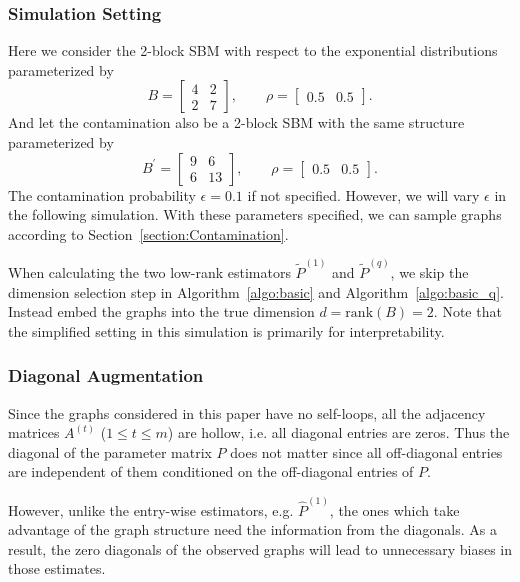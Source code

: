 \documentclass[a4paper]{article}
\renewcommand{\hat}{\widehat}
\begin{document}
\subsubsection{Simulation Setting}
\label{section:sim_setting}
Here we consider the 2-block SBM with respect to the exponential distributions parameterized by
\begin{equation*}
B = \begin{bmatrix}
4 & 2 \\
2 & 7
\end{bmatrix}
,\qquad \rho = \begin{bmatrix}
0.5 & 0.5
\end{bmatrix}.
\end{equation*}
And let the contamination also be a 2-block SBM with the same structure parameterized by
\begin{equation*}
B^{\prime} = \begin{bmatrix}
9 & 6 \\
6 & 13
\end{bmatrix}
,\qquad \rho = \begin{bmatrix}
0.5 & 0.5
\end{bmatrix}.
\end{equation*}
The contamination probability $\epsilon = 0.1$ if not specified. However, we will vary $\epsilon$ in the following simulation. With these parameters specified, we can sample graphs according to Section~\ref{section:Contamination}.

When calculating the two low-rank estimators $\widetilde{P}^{(1)}$ and $\widetilde{P}^{(q)}$, we skip the dimension selection step in Algorithm~\ref{algo:basic} and Algorithm~\ref{algo:basic_q}. Instead embed the graphs into the true dimension $d = \mathrm{rank}(B) = 2$.
Note that the simplified setting in this simulation is primarily for interpretability.


\subsubsection{Diagonal Augmentation}
\label{section:diag_aug}

Since the graphs considered in this paper have no self-loops, all the adjacency matrices $A^{(t)}$ ($1 \le t \le m$) are hollow, i.e. all diagonal entries are zeros. Thus the diagonal of the parameter matrix $P$ does not matter since all off-diagonal entries are independent of them conditioned on the off-diagonal entries of $P$.

However, unlike the entry-wise estimators, e.g. $\hat{P}^{(1)}$, the ones which take advantage of the graph structure need the information from the diagonals. As a result, the zero diagonals of the observed graphs will lead to unnecessary biases in those estimates.
\end{document}
